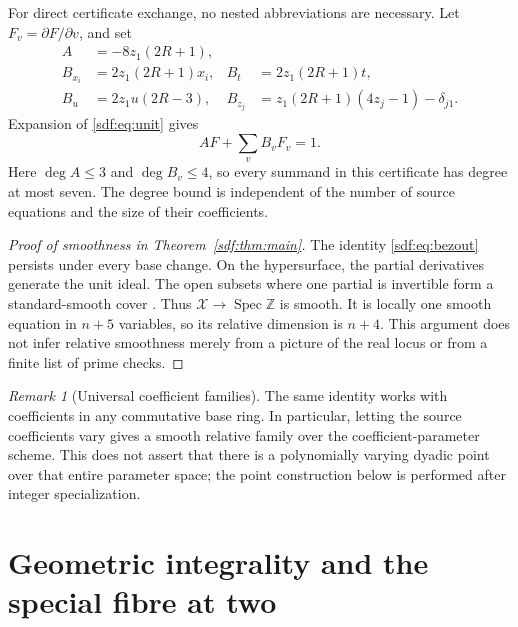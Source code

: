 \documentclass[11pt,a4paper]{article}
\theoremstyle{definition}
\theoremstyle{remark}
\newtheorem{remark}[theorem]{Remark}
\newcommand{\Z}{\mathbb Z}
\newcommand{\Spec}{\operatorname{Spec}}
\newcommand{\variety}{\mathcal X}
\begin{document}
For direct certificate exchange, no nested abbreviations are necessary.
Let $F_v=\partial F/\partial v$, and set
\begin{equation}\label{sdf:eq:coefficients}
\begin{aligned}
 A&=-8z_1(2R+1),\\
 B_{x_i}&=2z_1(2R+1)x_i,&
 B_t&=2z_1(2R+1)t,\\
 B_u&=2z_1u(2R-3),&
 B_{z_j}&=z_1(2R+1)(4z_j-1)-\delta_{j1}.
\end{aligned}
\end{equation}
Expansion of \eqref{sdf:eq:unit} gives
\begin{equation}\boxed{\displaystyle AF+\sum_v B_vF_v=1.}\label{sdf:eq:bezout}
\end{equation}
Here $\deg A\le3$ and $\deg B_v\le4$, so every summand in this certificate
has degree at most seven. The degree bound is independent of the number of
source equations and the size of their coefficients.

\begin{proof}[Proof of smoothness in Theorem~\ref{sdf:thm:main}]
The identity \eqref{sdf:eq:bezout} persists under every base change. On the
hypersurface, the partial derivatives generate the unit ideal. The open
subsets where one partial is invertible form a standard-smooth cover
\cite{stacks}. Thus $\variety\to\Spec\Z$ is smooth. It is locally one
smooth equation in $n+5$ variables, so its relative dimension is $n+4$.
This argument does not infer relative smoothness merely from a picture of
the real locus or from a finite list of prime checks.
\end{proof}

\begin{remark}[Universal coefficient families]
The same identity works with coefficients in any commutative base ring.
In particular, letting the source coefficients vary gives a smooth relative
family over the coefficient-parameter scheme. This does not assert that
there is a polynomially varying dyadic point over that entire parameter
space; the point construction below is performed after integer
specialization.
\end{remark}

\section{Geometric integrality and the special fibre at two}\label{sdf:sec:integrality}
\end{document}
